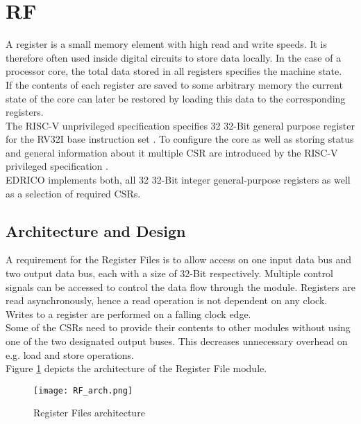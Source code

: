 \clearpage
\section{\acf{RF}}
A register is a small memory element with high read and write speeds. It is therefore often used inside digital circuits to store data locally. In the case of a processor core, the total data stored in all registers specifies the machine state.\\
If the contents of each register are saved to some arbitrary memory the current state of the core can later be restored by loading this data to the corresponding registers. \\
The RISC-V unprivileged specification specifies 32 32-Bit general purpose register for the RV32I base instruction set \cite{riscv:unprivileged}.
To configure the core as well as storing status and general information about it multiple \acf{CSR} are introduced by the RISC-V privileged specification \cite{riscv:privileged}.\\
EDRICO implements both, all 32 32-Bit integer general-purpose registers as well as a selection of required \acp{CSR}.

\subsection{Architecture and Design}
A requirement for the Register Files is to allow access on one input data bus and two output data bus, each with a size of 32-Bit respectively. Multiple control signals can be accessed to control the data flow through the module. Registers are read asynchronously, hence a read operation is not dependent on any clock. Writes to a register are performed on a falling clock edge.\\
Some of the \acp{CSR} need to provide their contents to other modules without using one of the two designated output buses. This decreases unnecessary overhead on e.g. load and store operations. \\
Figure \ref{fig:RF_arch} depicts the architecture of the Register File module.

\begin{figure}[H]
	\centering
	\texttt{[image: RF\_arch.png]}
	\caption{Register Files architecture}
	\label{fig:RF_arch}
\end{figure}

